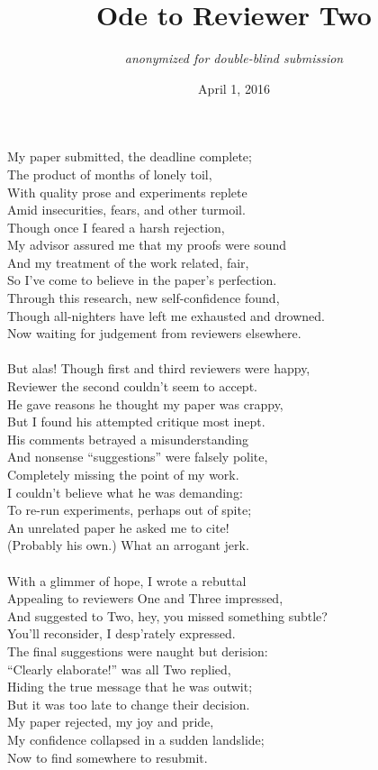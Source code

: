\documentclass{article}
\title{Ode to Reviewer Two}
\author{{\em anonymized for double-blind submission}}
\date{April 1, 2016}
\begin{document}
\maketitle
\thispagestyle{empty}

\noindent
My paper submitted, the deadline complete;\\
The product of months of lonely toil,\\
With quality prose and experiments replete\\
Amid insecurities, fears, and other turmoil.\\
Though once I feared a harsh rejection,\\
My advisor assured me that my proofs were sound\\
And my treatment of the work related, fair,\\
So I've come to believe in the paper's perfection.\\
Through this research, new self-confidence found,\\
Though all-nighters have left me exhausted and drowned.\\
Now waiting for judgement from reviewers elsewhere.\\
\\
But alas! Though first and third reviewers were happy,\\
Reviewer the second couldn't seem to accept.\\
He gave reasons he thought my paper was crappy,\\
But I found his attempted critique most inept.\\
His comments betrayed a misunderstanding\\
And nonsense ``suggestions'' were falsely polite,\\
Completely missing the point of my work.\\
I couldn't believe what he was demanding:\\
To re-run experiments, perhaps out of spite;\\
An unrelated paper he asked me to cite!\\
(Probably his own.) What an arrogant jerk.\\
\\
With a glimmer of hope, I wrote a rebuttal\\
Appealing to reviewers One and Three impressed,\\
And suggested to Two, hey, you missed something subtle?\\
You'll reconsider, I desp'rately expressed.\\
The final suggestions were naught but derision:\\
``Clearly elaborate!'' was all Two replied,\\
Hiding the true message that he was outwit;\\
But it was too late to change their decision.\\
My paper rejected, my joy and pride,\\
My confidence collapsed in a sudden landslide;\\
Now to find somewhere to resubmit.\\
\end{document}
